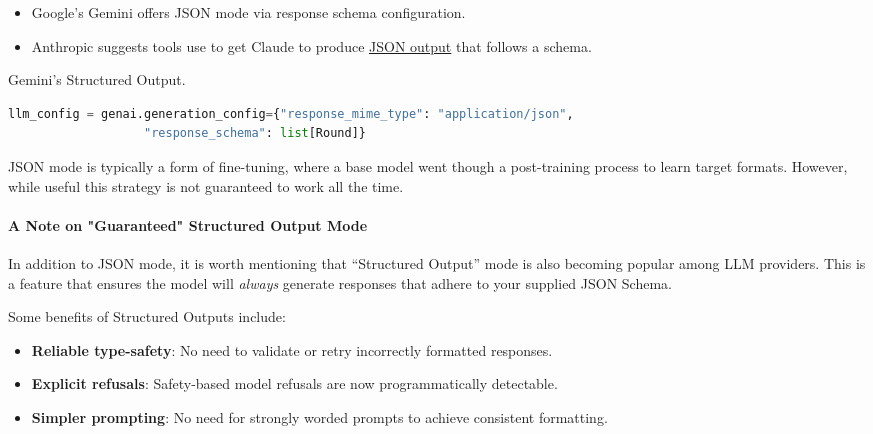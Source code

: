 \begin{itemize}
    \item Google's Gemini offers JSON mode via response schema configuration.
    \item Anthropic  suggests tools use to get Claude to produce \href{https://docs.anthropic.com/en/docs/build-with-claude/tool-use#json-mode}{JSON output} that follows a schema.
\end{itemize}
\begin{marginlisting}[-1.35cm]
	\caption{Gemini's Structured Output.}
    \label{lst:gemini-structured}
	\vspace{0.6cm}
	\begin{lstlisting}[language=Python,style=kaolstplain]
llm_config = genai.generation_config={"response_mime_type": "application/json",
                   "response_schema": list[Round]}
	\end{lstlisting}
\end{marginlisting}


JSON mode is typically a form of fine-tuning, where a base model went though a post-training process to learn target formats. However, while useful this strategy is not guaranteed to work all the time.

\paragraph{A Note on "Guaranteed" Structured Output Mode}

In addition to JSON mode, it is worth mentioning that ``Structured Output'' mode is also becoming popular among LLM providers. This is a feature that ensures the model will \textit{always} generate responses that adhere to your supplied JSON Schema.

Some benefits of Structured Outputs include:
\begin{itemize}
    \item \textbf{Reliable type-safety}: No need to validate or retry incorrectly formatted responses.
    \item \textbf{Explicit refusals}: Safety-based model refusals are now programmatically detectable.
    \item \textbf{Simpler prompting}: No need for strongly worded prompts to achieve consistent formatting.
\end{itemize}

